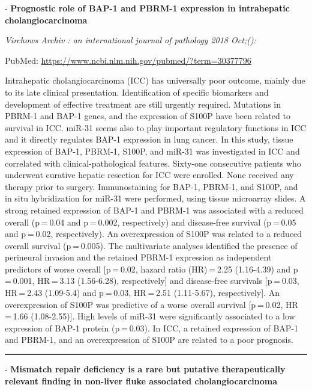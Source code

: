 \documentclass[]{article}
\begin{document}
 - \textbf{Prognostic role of BAP-1 and PBRM-1 expression in
intrahepatic cholangiocarcinoma}

\emph{Virchows Archiv : an international journal of pathology 2018
Oct;():}

PubMed: \url{https://www.ncbi.nlm.nih.gov/pubmed/?term=30377796}

Intrahepatic cholangiocarcinoma (ICC) has universally poor outcome,
mainly due to its late clinical presentation. Identification of specific
biomarkers and development of effective treatment are still urgently
required. Mutations in PBRM-1 and BAP-1 genes, and the expression of
S100P have been related to survival in ICC. miR-31 seems also to play
important regulatory functions in ICC and it directly regulates BAP-1
expression in lung cancer. In this study, tissue expression of BAP-1,
PBRM-1, S100P, and miR-31 was investigated in ICC and correlated with
clinical-pathological features. Sixty-one consecutive patients who
underwent curative hepatic resection for ICC were enrolled. None
received any therapy prior to surgery. Immunostaining for BAP-1, PBRM-1,
and S100P, and in situ hybridization for miR-31 were performed, using
tissue microarray slides. A strong retained expression of BAP-1 and
PBRM-1 was associated with a reduced overall (p = 0.04 and p = 0.002,
respectively) and disease-free survival (p = 0.05 and p = 0.02,
respectively). An overexpression of S100P was related to a reduced
overall survival (p = 0.005). The multivariate analyses identified the
presence of perineural invasion and the retained PBRM-1 expression as
independent predictors of worse overall {[}p = 0.02, hazard ratio
(HR) = 2.25 (1.16-4.39) and p = 0.001, HR = 3.13 (1.56-6.28),
respectively{]} and disease-free survivals {[}p = 0.03, HR = 2.43
(1.09-5.4) and p = 0.03, HR = 2.51 (1.11-5.67), respectively{]}. An
overexpression of S100P was predictive of a worse overall survival
{[}p = 0.02, HR = 1.66 (1.08-2.55){]}. High levels of miR-31 were
significantly associated to a low expression of BAP-1 protein
(p = 0.03). In ICC, a retained expression of BAP-1 and PBRM-1, and an
overexpression of S100P are related to a poor prognosis.

{}

{}

\begin{center}\rule{0.5\linewidth}{\linethickness}\end{center}

 - \textbf{Mismatch repair deficiency is a rare but putative
therapeutically relevant finding in non-liver fluke associated
cholangiocarcinoma}
\end{document}

